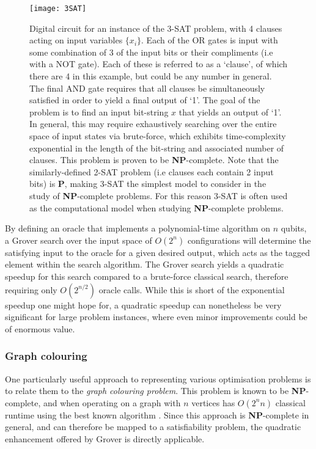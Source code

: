 \begin{figure}[!htbp]
\texttt{[image: 3SAT]}
\captionspacefig \caption{Digital circuit for an instance of the 3-\textsc{SAT} problem, with 4 clauses acting on input variables $\{x_i\}$. Each of the OR gates is input with some combination of 3 of the input bits or their compliments (i.e with a NOT gate). Each of these is referred to as a `clause', of which there are 4 in this example, but could be any number in general. The final AND gate requires that all clauses be simultaneously satisfied in order to yield a final output of `1'. The goal of the problem is to find an input bit-string $x$ that yields an output of `1'. In general, this may require exhaustively searching over the entire space of input states via brute-force, which exhibits time-complexity exponential in the length of the bit-string and associated number of clauses. This problem is proven to be \textbf{NP}-complete. Note that the similarly-defined 2-\textsc{SAT} problem (i.e clauses each contain 2 input bits) is \textbf{P}, making 3-\textsc{SAT} the simplest model to consider in the study of \textbf{NP}-complete problems. For this reason 3-\textsc{SAT} is often used as the computational model when studying \textbf{NP}-complete problems.} \label{fig:3SAT}	
\end{figure}

By defining an oracle that implements a polynomial-time algorithm on $n$ qubits, a Grover search over the input space of $O(2^n)$ configurations will determine the satisfying input to the oracle for a given desired output, which acts as the tagged element within the search algorithm. The Grover search yields a quadratic speedup for this search compared to a brute-force classical search, therefore requiring only $O(2^{n/2})$ oracle calls. While this is short of the exponential speedup one might hope for, a quadratic speedup can nonetheless be very significant for large problem instances, where even minor improvements could be of enormous value.

\subsubsection{Graph colouring}

One particularly useful approach to representing various optimisation problems is to relate them to the \textit{graph colouring problem}. This problem is known to be \textbf{NP}-complete, and when operating on a graph with $n$ vertices has $O(2^nn)$ classical runtime using the best known algorithm \cite{???}. Since this approach is \textbf{NP}-complete in general, and can therefore be mapped to a satisfiability problem, the quadratic enhancement offered by Grover is directly applicable.

